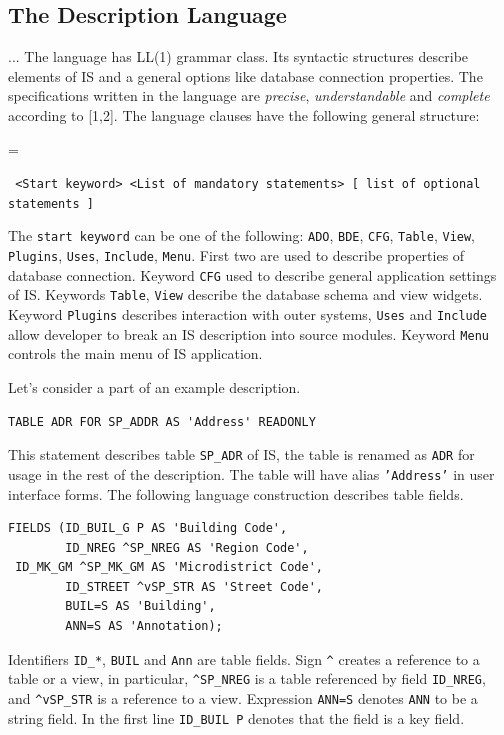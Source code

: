 \documentclass[conference]{IEEEtran}
\newenvironment{asdcode}{\hangindent=\parindent\hangafter=1\par\noindent\small\tt}{}
\begin{document}
\subsection{The Description Language}

... The language has LL(1) grammar class.  Its syntactic structures describe elements of IS and a general options like database connection properties.  The specifications written in the language are \emph{precise}, \emph{understandable} and \emph{complete} according to [1,2].  The language clauses have the following general structure:

\begin{asdcode}%
<Start keyword> <List of mandatory statements> [~list of optional statements~]
\end{asdcode}

The \texttt{start keyword} can be one of the following: \texttt{ADO}, \texttt{BDE}, \texttt{CFG}, \texttt{Table}, \texttt{View}, \texttt{Plugins}, \texttt{Uses}, \texttt{Include}, \texttt{Menu}.  First two are used to describe properties of database connection.  Keyword \texttt{CFG} used to describe general application settings of IS.  Keywords \texttt{Table}, \texttt{View} describe the database schema and view widgets.  Keyword \texttt{Plugins} describes interaction with outer systems, \texttt{Uses} and \texttt{Include} allow developer to break an IS description into source modules.  Keyword \texttt{Menu} controls the main menu of IS application.

Let's consider a part of an example description.

\begin{lstlisting}
TABLE ADR FOR SP_ADDR AS 'Address' READONLY
\end{lstlisting}

This statement describes table \texttt{SP\_ADR} of IS, the table is renamed as \texttt{ADR} for usage in the rest of the description. The table will have alias \texttt{'Address'} in user interface forms.  The following language construction describes table fields.

\begin{lstlisting}
FIELDS (ID_BUIL_G P AS 'Building Code',
        ID_NREG ^SP_NREG AS 'Region Code',
 ID_MK_GM ^SP_MK_GM AS 'Microdistrict Code',
        ID_STREET ^vSP_STR AS 'Street Code',
        BUIL=S AS 'Building',
        ANN=S AS 'Annotation);
\end{lstlisting}

Identifiers \texttt{ID\_*}, \texttt{BUIL} and \texttt{Ann} are table fields.  Sign \texttt{\^} creates a reference to a table or a view, in particular, \texttt{\^{}SP\_NREG} is a table referenced by field \texttt{ID\_NREG}, and \texttt{\^{}vSP\_STR} is a reference to a view.  Expression \texttt{ANN=S} denotes \texttt{ANN} to be a string field.  In the first line \texttt{ID\_BUIL P} denotes that the field is a key field.
\end{document}
